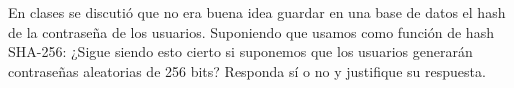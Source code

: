 En clases se discutió que no era buena idea guardar en una base de datos el hash de la contraseña de los usuarios. Suponiendo que usamos como función de hash SHA-256: ¿Sigue siendo esto cierto si suponemos que los usuarios generarán contraseñas aleatorias de 256 bits? Responda sí o no y justifique su respuesta.
